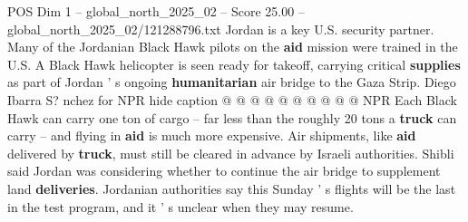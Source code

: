 \begin{textsample}{POS Dim 1 – global\_north\_2025\_02 – Score 25.00 – global\_north\_2025\_02/121288796.txt}
Jordan is a key U.S. security partner.
Many of the Jordanian Black Hawk pilots on the \textbf{aid} mission were trained in the U.S.
A Black Hawk helicopter is seen ready for takeoff, carrying critical \textbf{supplies} as part of Jordan ' s ongoing \textbf{humanitarian} air bridge to the Gaza Strip.
Diego Ibarra S? nchez for NPR hide caption @ @ @ @ @ @ @ @ @ @ NPR Each Black Hawk can carry one ton of cargo -- far less than the roughly 20 tons a \textbf{truck} can carry -- and flying in \textbf{aid} is much more expensive.
Air shipments, like \textbf{aid} delivered by \textbf{truck}, must still be cleared in advance by Israeli authorities.
Shibli said Jordan was considering whether to continue the air bridge to supplement land \textbf{deliveries}.
Jordanian authorities say this Sunday ' s flights will be the last in the test program, and it ' s unclear when they may resume.

\end{textsample}
